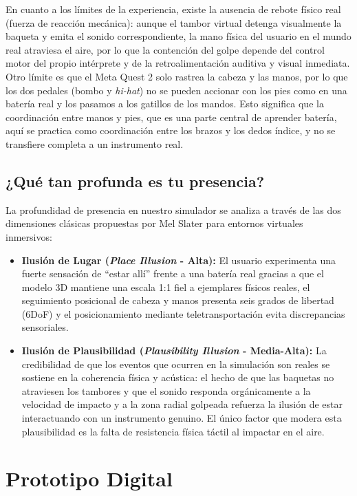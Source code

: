 \documentclass{article}
\begin{document}
En cuanto a los límites de la experiencia, existe la ausencia de rebote físico real (fuerza de reacción mecánica): aunque el tambor virtual detenga visualmente la baqueta y emita el sonido correspondiente, la mano física del usuario en el mundo real atraviesa el aire, por lo que la contención del golpe depende del control motor del propio intérprete y de la retroalimentación auditiva y visual inmediata. Otro límite es que el Meta Quest 2 solo rastrea la cabeza y las manos, por lo que los dos pedales (bombo y \textit{hi-hat}) no se pueden accionar con los pies como en una batería real y los pasamos a los gatillos de los mandos. Esto significa que la coordinación entre manos y pies, que es una parte central de aprender batería, aquí se practica como coordinación entre los brazos y los dedos índice, y no se transfiere completa a un instrumento real.

\subsection{¿Qué tan profunda es tu presencia?}
La profundidad de presencia en nuestro simulador se analiza a través de las dos dimensiones clásicas propuestas por Mel Slater para entornos virtuales inmersivos:
\begin{itemize}
    \item \textbf{Ilusión de Lugar (\textit{Place Illusion} - Alta):} El usuario experimenta una fuerte sensación de ``estar allí'' frente a una batería real gracias a que el modelo 3D mantiene una escala 1:1 fiel a ejemplares físicos reales, el seguimiento posicional de cabeza y manos presenta seis grados de libertad (6DoF) y el posicionamiento mediante teletransportación evita discrepancias sensoriales.
    \item \textbf{Ilusión de Plausibilidad (\textit{Plausibility Illusion} - Media-Alta):} La credibilidad de que los eventos que ocurren en la simulación son reales se sostiene en la coherencia física y acústica: el hecho de que las baquetas no atraviesen los tambores y que el sonido responda orgánicamente a la velocidad de impacto y a la zona radial golpeada refuerza la ilusión de estar interactuando con un instrumento genuino. El único factor que modera esta plausibilidad es la falta de resistencia física táctil al impactar en el aire.
\end{itemize}

\section{Prototipo Digital}
\end{document}
